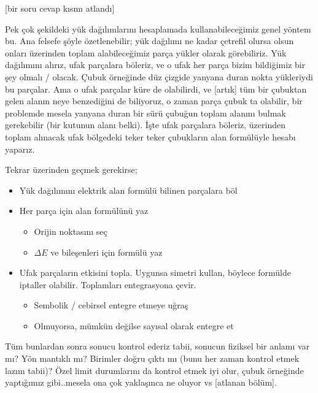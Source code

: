 \documentclass[12pt,fleqn]{article}\usepackage{../../common}
\begin{document}
[bir soru cevap kısmı atlandı]

Pek çok şekildeki yük dağılımlarını hesaplamada kullanabileceğimiz genel
yöntem bu. Ana felsefe şöyle özetlenebilir; yük dağılımı ne kadar çetrefil
olursa olsun onları üzerinden toplam alabileceğimiz parça yükler olarak
görebiliriz. Yük dağılımını alırız, ufak parçalara böleriz, ve o ufak her
parça bizim bildiğimiz bir şey olmalı / olacak. Çubuk örneğinde düz çizgide
yanyana duran nokta yükleriydi bu parçalar. Ama o ufak parçalar küre de
olabilirdi, ve [artık] tüm bir çubuktan gelen alanın neye benzediğini de
biliyoruz, o zaman parça çubuk ta olabilir, bir problemde mesela yanyana
duran bir sürü çubuğun toplam alanını bulmak gerekebilir (bir kutunun alanı
belki). İşte ufak parçalara böleriz, üzerinden toplam alınacak ufak
bölgedeki teker teker çubukların alan formülüyle hesabı yaparız.

Tekrar üzerinden geçmek gerekirse;

\begin{itemize}
   \item Yük dağılımını elektrik alan formülü bilinen parçalara böl
   \item Her parça için alan formülünü yaz
     \begin{itemize}
        \item Orijin noktasını seç
        \item $\Delta E$ ve bileşenleri için formülü yaz
     \end{itemize}
   \item Ufak parçaların etkisini topla. Uygunsa simetri kullan, böylece
     formülde iptaller olabilir. Toplamları entegrasyona çevir. 
     \begin{itemize}
        \item Sembolik / cebirsel entegre etmeye uğraş
        \item Olmuyorsa, mümkün değilse sayısal olarak entegre et
     \end{itemize}
\end{itemize}

Tüm bunlardan sonra sonucu kontrol ederiz tabii, sonucun fiziksel bir
anlamı var mı? Yön mantıklı mı? Birimler doğru çıktı mı (bunu her zaman
kontrol etmek lazım tabii)? Özel limit durumlarını da kontrol etmek iyi
olur, çubuk örneğinde yaptığımız gibi..mesela ona çok yaklaşınca ne oluyor
vs [atlanan bölüm].     
\end{document}
